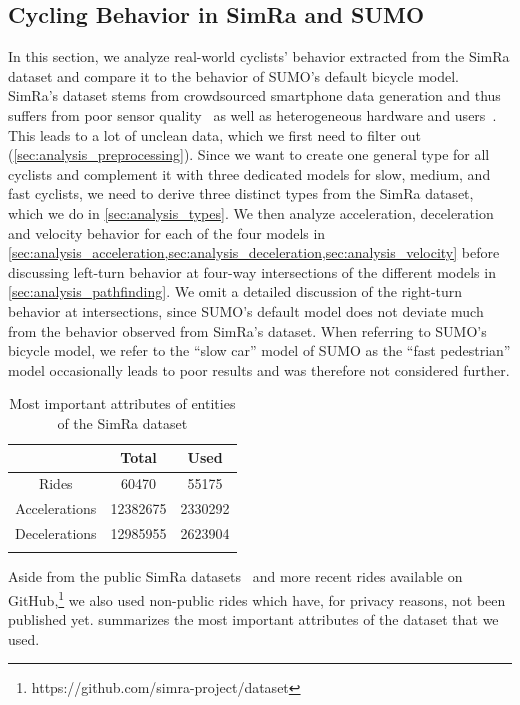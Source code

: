 \subsection{Cycling Behavior in SimRa and SUMO}
\label{subsec:cycling_behavior_in_simra_and_sumo}
In this section, we analyze real-world cyclists' behavior extracted from the SimRa dataset and compare it to the behavior of SUMO's default bicycle model.
SimRa's dataset stems from crowdsourced smartphone data generation and thus suffers from poor sensor quality~\cite{chowdhury2014estimating, usami2018bicycle} as well as heterogeneous hardware and users~\cite{basiri2018impact}.
This leads to a lot of unclean data, which we first need to filter out (\cref{sec:analysis_preprocessing}).
Since we want to create one general type for all cyclists and complement it with three dedicated models for slow, medium, and fast cyclists, we need to derive three distinct types from the SimRa dataset, which we do in \cref{sec:analysis_types}.
We then analyze acceleration, deceleration and velocity behavior for each of the four models in \cref{sec:analysis_acceleration,sec:analysis_deceleration,sec:analysis_velocity} before discussing left-turn behavior at four-way intersections of the different models in \cref{sec:analysis_pathfinding}.
We omit a detailed discussion of the right-turn behavior at intersections, since SUMO's default model does not deviate much from the behavior observed from SimRa's dataset.
When referring to SUMO's bicycle model, we refer to the ``slow car'' model of SUMO as the ``fast pedestrian'' model occasionally leads to poor results and was therefore not considered further.

\begin{table}
\centering
\caption{Most important attributes of entities of the SimRa dataset}%
\label{tab:dataset}
\begin{tabular}{ccc}
\toprule
& Total & Used \\
\midrule
\midrule
Rides & \num{60470} & \num{55175} \\
Accelerations & \num{12382675} & \num{2330292} \\
Decelerations & \num{12985955} & \num{2623904} \\
\bottomrule&
\end{tabular}
\end{table}

Aside from the public SimRa datasets~\cite{dataset_simra_set1,dataset_simra_set2, dataset_simra_set3} and more recent rides available on GitHub,\footnote{https://github.com/simra-project/dataset} we also used non-public rides which have, for privacy reasons, not been published yet.
 summarizes the most important attributes of the dataset that we used.

